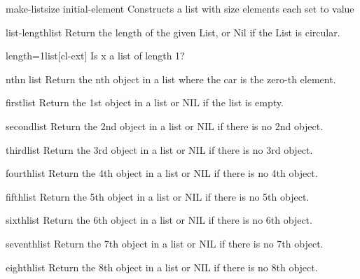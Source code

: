 \documentclass[10pt,english]{book}
\begin{document}
\begin{function}{make-list}{size \key initial-element}
  Constructs a list with size elements each set to value
\end{function}

\begin{function}{list-length}{list}
  Return the length of the given List, or Nil if the List is circular.
\end{function}

\begin{function}{length=1}{list}[cl-ext]
  Is x a list of length 1?
\end{function}

\begin{accessor}{nth}{n list}
  Return the nth object in a list where the car is the zero-th element.
\end{accessor}

\begin{accessor}{first}{list}
  Return the 1st object in a list or NIL if the list is empty.
\end{accessor}

\begin{accessor}{second}{list}
  Return the 2nd object in a list or NIL if there is no 2nd object.
\end{accessor}

\begin{accessor}{third}{list}
  Return the 3rd object in a list or NIL if there is no 3rd object.
\end{accessor}

\begin{accessor}{fourth}{list}
  Return the 4th object in a list or NIL if there is no 4th object.
\end{accessor}

\begin{accessor}{fifth}{list}
  Return the 5th object in a list or NIL if there is no 5th object.
\end{accessor}

\begin{accessor}{sixth}{list}
  Return the 6th object in a list or NIL if there is no 6th object.
\end{accessor}

\begin{accessor}{seventh}{list}
  Return the 7th object in a list or NIL if there is no 7th object.
\end{accessor}

\begin{accessor}{eighth}{list}
  Return the 8th object in a list or NIL if there is no 8th object.
\end{accessor}
\end{document}
